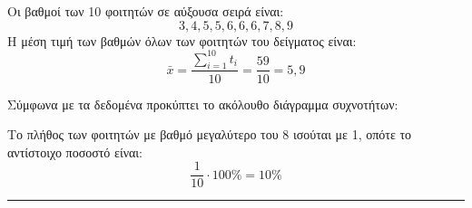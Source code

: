 \begin{alist}
\item Οι βαθμοί των 10 φοιτητών σε αύξουσα σειρά είναι:
\[ 3, 4, 5, 5, 6, 6, 6, 7, 8, 9 \]
Η μέση τιμή των βαθμών όλων των φοιτητών του δείγματος είναι:
\[ \bar{x} = \frac{\sum\limits_{i=1}^{10} t_i}{10} = \frac{59}{10} = 5,9 \]

\item Σύμφωνα με τα δεδομένα προκύπτει το ακόλουθο διάγραμμα συχνοτήτων:

\begin{center}
\end{center}

\item Το πλήθος των φοιτητών με βαθμό μεγαλύτερο του 8 ισούται με 1, οπότε το αντίστοιχο ποσοστό είναι:
\[ \frac{1}{10} \cdot 100\% = 10\% \]
\end{alist}
\vspace{6mm}
\noindent\rule{\textwidth}{0.4pt}
\vspace{6mm}

